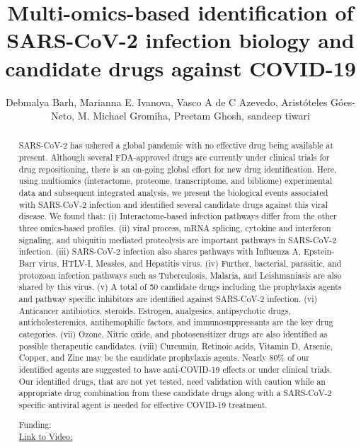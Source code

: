 \documentclass[twoside]{article}
\title{\vspace{-15mm}\fontsize{24pt}{10pt}\selectfont\textbf{ Multi-omics-based identification of SARS-CoV-2 infection biology and candidate drugs against COVID-19 }} %
\author{ Debmalya Barh,  Marianna E. Ivanova,  Vasco A de C Azevedo,  Arist\'oteles G\'oes-Neto,  M. Michael Gromiha,  Preetam Ghosh,  sandeep tiwari }
\affil{ INAPG- Fran\c{c}a,  UNIVERSIDADE FEDERAL DE MINAS GERAIS }
\date{}
\begin{document}
  
  
  \maketitle %
  
  
  \thispagestyle{fancy} %
  
  
  \begin{abstract}
  SARS-CoV-2 has ushered a global pandemic with no effective drug being available at present. Although several FDA-approved drugs are currently under clinical trials for drug repositioning,  there is an on-going global effort for new drug identification. Here,  using multiomics (interactome,  proteome,  transcriptome,  and bibliome) experimental data and subsequent integrated analysis,  we present the biological events associated with SARS-CoV-2 infection and identified several candidate drugs against this viral disease. We found that: (i) Interactome-based infection pathways differ from the other three omics-based profiles. (ii) viral process,  mRNA splicing,  cytokine and interferon signaling,  and ubiquitin mediated proteolysis are important pathways in SARS-CoV-2 infection. (iii) SARS-CoV-2 infection also shares pathways with Influenza A,  Epstein-Barr virus,  HTLV-I,  Measles,  and Hepatitis virus. (iv) Further,  bacterial,  parasitic,  and protozoan infection pathways such as Tuberculosis,  Malaria,  and Leishmaniasis are also shared by this virus. (v) A total of 50 candidate drugs including the prophylaxis agents and pathway specific inhibitors are identified against SARS-CoV-2 infection. (vi) Anticancer antibiotics,  steroids,  Estrogen,  analgesics,  antipsychotic drugs,  anticholesteremics,  antihemophilic factors,  and immunosuppressants are the key drug categories. (vii) Ozone,  Nitric oxide,  and photosensitizer drugs are also identified as possible therapeutic candidates. (viii) Curcumin,  Retinoic acids,  Vitamin D,  Arsenic,  Copper,  and Zinc may be the candidate prophylaxis agents. Nearly 80\% of our identified agents are suggested to have anti-COVID-19 effects or under clinical trials. Our identified drugs,  that are not yet tested,  need validation with caution while an appropriate drug combination from these candidate drugs along with a SARS-CoV-2 specific antiviral agent is needed for effective COVID-19 treatment.
  
  Funding:   \\
  \href{http://ab3c.org.br/xpress_pres2020/xmxp2020-302928.html}{Link to Video:}

  \end{abstract}
   
  
\end{document}
